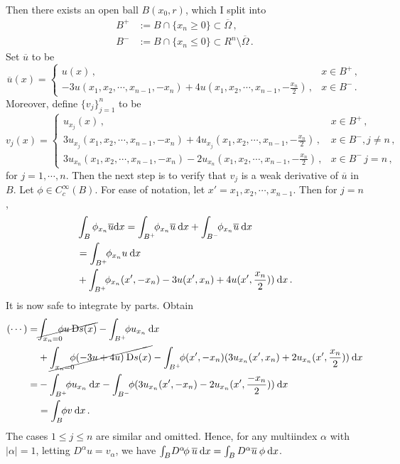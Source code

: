 \documentclass[11pt]{amsart}
\theoremstyle{definition}
\numberwithin{equation}{section}
\begin{document}
Then there exists an open ball $B(x_0, r)$, which I split into
\begin{align*}
B^+ &:= B \cap \{x_n \geq 0\} \subset \overline{\Omega}\,,\\
B^- &:=
B \cap \{x_n \leq 0\} \subset R^n \setminus \overline{\Omega}\,.
\end{align*}
Set $\overline{u}$ to be
\begin{equation}
\overline{u}(x) =
\left\{
\begin{array}{lc}
u(x)\,,&x\in B^+\,,\\
-3u(x_1,x_2,\cdots,x_{n-1},-x_n)
+ 4u(x_1,x_2,\cdots,x_{n-1},-\frac{x_n}{2})
\,,
&x\in B^-\,.
\end{array}
\right.
\end{equation}
Moreover, define $\{v_j\}_{j=1}^n$ to be
\begin{equation}
v_j(x) =
\left\{
\begin{array}{lc}
u_{x_j}(x)\,,&x\in B^+\,,\\
3u_{x_j}(x_1,x_2,\cdots,x_{n-1},-x_n)
+ 4u_{x_j}(x_1,x_2,\cdots,x_{n-1},-\frac{x_n}{2})
\,,
&x\in B^-, j\neq n\,,
\\
3u_{x_n}(x_1,x_2,\cdots,x_{n-1},-x_n)
- 2u_{x_n}(x_1,x_2,\cdots,x_{n-1},-\frac{x_n}{2})
\,,
&x\in B^-\, j = n\,,
\end{array}
\right.
\end{equation}
for $j = 1, \cdots, n$.
Then the next step is to verify that $v_j$ is a weak derivative of $\overline{u}$ in $B$. Let $\phi \in C^\infty_c(B)$. 
For ease of notation, let $x' = x_1, x_2, \cdots, x_{n-1}$.
Then for $j = n$,
\begin{align*}
&\int_B \phi_{x_n} \overline{u}\dx
=
\int_{B^+}\!\! \phi_{x_n} \overline{u}\:\dx
+
\int_{B^-}\!\! \phi_{x_n} \overline{u}\:\dx
\\
&=
\int_{B^+}\!\! \phi_{x_n} u \:\dx\\
&+
\int_{B^+}\!\! \phi_{x_n}(x', -x_n) 
-3u(x',x_n)
+ 4u(x',\frac{x_n}{2}))
\:\dx \,.
\end{align*}
It is now safe to integrate by parts. Obtain
\begin{align*}
(\cdots)
=
&
\cancel{
\int_{x_n = 0}\!\!\!\! \phi u \:\mbox{D}s(x)
}
-
\int_{B^+}\!\! \phi u_{x_n} \:\dx\\
&+
\cancel{
\int_{x_n = 0}\!\!\!\! \phi
(-3u+ 4u)
 \:\mbox{D}s(x)
}
-
\int_{B^+}\!\! \phi(x',-x_n)(
3u_{x_n}(x',x_n) + 2u_{x_n}(x',\frac{x_n}{2})
) \:\dx \\
=&
-\int_{B^+}\!\! \phi u_{x_n} \:\dx
-\int_{B^-}\!\! \phi(3u_{x_n}(x',-x_n) - 2u_{x_n}(x',\frac{-x_n}{2}))\:\dx \\
&=
\int_B\!\!\phi v \:\dx\,.
\end{align*}
\newcommand{\hbnorm}[2]{||#1||_{C^{0,\gamma}(\overline{#2})}}
The cases $1 \leq j \leq n$ are similar and omitted. Hence, for any multiindex $\alpha$ with $|\alpha| = 1$, letting $D^\alpha u = v_\alpha$, we have $\int_B\!  D^\alpha \!\phi\: \overline{u}\:\mbox{d}x
= \int_B D^\alpha \overline{u} \:\phi\: \mbox{d}x$.
\end{document}
